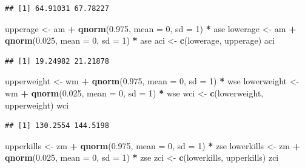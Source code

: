 \documentclass[]{article}
\newenvironment{Shaded}{\begin{snugshade}}{\end{snugshade}}
\newcommand{\KeywordTok}[1]{\textcolor[rgb]{0.13,0.29,0.53}{\textbf{#1}}}
\newcommand{\DataTypeTok}[1]{\textcolor[rgb]{0.13,0.29,0.53}{#1}}
\newcommand{\DecValTok}[1]{\textcolor[rgb]{0.00,0.00,0.81}{#1}}
\newcommand{\FloatTok}[1]{\textcolor[rgb]{0.00,0.00,0.81}{#1}}
\newcommand{\StringTok}[1]{\textcolor[rgb]{0.31,0.60,0.02}{#1}}
\newcommand{\OperatorTok}[1]{\textcolor[rgb]{0.81,0.36,0.00}{\textbf{#1}}}
\newcommand{\NormalTok}[1]{#1}
\begin{document}
\begin{verbatim}
## [1] 64.91031 67.78227
\end{verbatim}

\begin{Shaded}
\begin{Highlighting}[]
\NormalTok{upperage <-}\StringTok{ }\NormalTok{am }\OperatorTok{+}\StringTok{ }\KeywordTok{qnorm}\NormalTok{(}\FloatTok{0.975}\NormalTok{, }\DataTypeTok{mean =} \DecValTok{0}\NormalTok{, }\DataTypeTok{sd =} \DecValTok{1}\NormalTok{) }\OperatorTok{*}\StringTok{ }\NormalTok{ase}
\NormalTok{lowerage <-}\StringTok{ }\NormalTok{am }\OperatorTok{+}\StringTok{ }\KeywordTok{qnorm}\NormalTok{(}\FloatTok{0.025}\NormalTok{, }\DataTypeTok{mean =} \DecValTok{0}\NormalTok{, }\DataTypeTok{sd =} \DecValTok{1}\NormalTok{) }\OperatorTok{*}\StringTok{ }\NormalTok{ase }
\NormalTok{aci <-}\StringTok{ }\KeywordTok{c}\NormalTok{(lowerage, upperage)}
\NormalTok{aci}
\end{Highlighting}
\end{Shaded}

\begin{verbatim}
## [1] 19.24982 21.21878
\end{verbatim}

\begin{Shaded}
\begin{Highlighting}[]
\NormalTok{upperweight <-}\StringTok{ }\NormalTok{wm }\OperatorTok{+}\StringTok{ }\KeywordTok{qnorm}\NormalTok{(}\FloatTok{0.975}\NormalTok{, }\DataTypeTok{mean =} \DecValTok{0}\NormalTok{, }\DataTypeTok{sd =} \DecValTok{1}\NormalTok{) }\OperatorTok{*}\StringTok{ }\NormalTok{wse}
\NormalTok{lowerweight <-}\StringTok{ }\NormalTok{wm }\OperatorTok{+}\StringTok{ }\KeywordTok{qnorm}\NormalTok{(}\FloatTok{0.025}\NormalTok{, }\DataTypeTok{mean =} \DecValTok{0}\NormalTok{, }\DataTypeTok{sd =} \DecValTok{1}\NormalTok{) }\OperatorTok{*}\StringTok{ }\NormalTok{wse }
\NormalTok{wci <-}\StringTok{ }\KeywordTok{c}\NormalTok{(lowerweight, upperweight)}
\NormalTok{wci}
\end{Highlighting}
\end{Shaded}

\begin{verbatim}
## [1] 130.2554 144.5198
\end{verbatim}

\begin{Shaded}
\begin{Highlighting}[]
\NormalTok{upperkills <-}\StringTok{ }\NormalTok{zm }\OperatorTok{+}\StringTok{ }\KeywordTok{qnorm}\NormalTok{(}\FloatTok{0.975}\NormalTok{, }\DataTypeTok{mean =} \DecValTok{0}\NormalTok{, }\DataTypeTok{sd =} \DecValTok{1}\NormalTok{) }\OperatorTok{*}\StringTok{ }\NormalTok{zse}
\NormalTok{lowerkills <-}\StringTok{ }\NormalTok{zm }\OperatorTok{+}\StringTok{ }\KeywordTok{qnorm}\NormalTok{(}\FloatTok{0.025}\NormalTok{, }\DataTypeTok{mean =} \DecValTok{0}\NormalTok{, }\DataTypeTok{sd =} \DecValTok{1}\NormalTok{) }\OperatorTok{*}\StringTok{ }\NormalTok{zse }
\NormalTok{zci <-}\StringTok{ }\KeywordTok{c}\NormalTok{(lowerkills, upperkills)}
\NormalTok{zci}
\end{Highlighting}
\end{Shaded}
\end{document}
